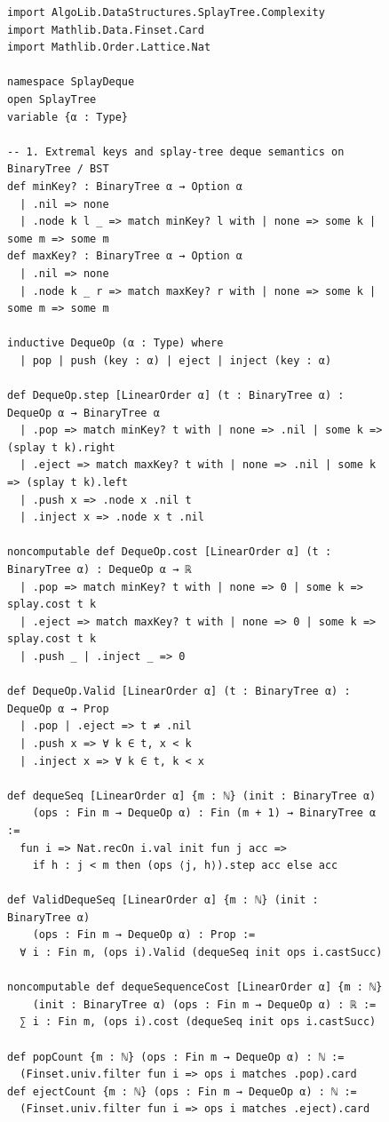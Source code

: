 \documentclass[11pt]{article}
\theoremstyle{definition}
\theoremstyle{remark}
\begin{document}
\begin{figure}[p]
\begin{lstlisting}[style=leanstyle]
import AlgoLib.DataStructures.SplayTree.Complexity
import Mathlib.Data.Finset.Card
import Mathlib.Order.Lattice.Nat

namespace SplayDeque
open SplayTree
variable {α : Type}

-- 1. Extremal keys and splay-tree deque semantics on BinaryTree / BST
def minKey? : BinaryTree α → Option α
  | .nil => none
  | .node k l _ => match minKey? l with | none => some k | some m => some m
def maxKey? : BinaryTree α → Option α
  | .nil => none
  | .node k _ r => match maxKey? r with | none => some k | some m => some m

inductive DequeOp (α : Type) where
  | pop | push (key : α) | eject | inject (key : α)

def DequeOp.step [LinearOrder α] (t : BinaryTree α) : DequeOp α → BinaryTree α
  | .pop => match minKey? t with | none => .nil | some k => (splay t k).right
  | .eject => match maxKey? t with | none => .nil | some k => (splay t k).left
  | .push x => .node x .nil t
  | .inject x => .node x t .nil

noncomputable def DequeOp.cost [LinearOrder α] (t : BinaryTree α) : DequeOp α → ℝ
  | .pop => match minKey? t with | none => 0 | some k => splay.cost t k
  | .eject => match maxKey? t with | none => 0 | some k => splay.cost t k
  | .push _ | .inject _ => 0

def DequeOp.Valid [LinearOrder α] (t : BinaryTree α) : DequeOp α → Prop
  | .pop | .eject => t ≠ .nil
  | .push x => ∀ k ∈ t, x < k
  | .inject x => ∀ k ∈ t, k < x

def dequeSeq [LinearOrder α] {m : ℕ} (init : BinaryTree α)
    (ops : Fin m → DequeOp α) : Fin (m + 1) → BinaryTree α :=
  fun i => Nat.recOn i.val init fun j acc =>
    if h : j < m then (ops ⟨j, h⟩).step acc else acc

def ValidDequeSeq [LinearOrder α] {m : ℕ} (init : BinaryTree α)
    (ops : Fin m → DequeOp α) : Prop :=
  ∀ i : Fin m, (ops i).Valid (dequeSeq init ops i.castSucc)

noncomputable def dequeSequenceCost [LinearOrder α] {m : ℕ}
    (init : BinaryTree α) (ops : Fin m → DequeOp α) : ℝ :=
  ∑ i : Fin m, (ops i).cost (dequeSeq init ops i.castSucc)

def popCount {m : ℕ} (ops : Fin m → DequeOp α) : ℕ :=
  (Finset.univ.filter fun i => ops i matches .pop).card
def ejectCount {m : ℕ} (ops : Fin m → DequeOp α) : ℕ :=
  (Finset.univ.filter fun i => ops i matches .eject).card


\end{lstlisting}
\end{figure}
\end{document}
